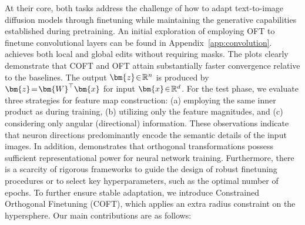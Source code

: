 At their core, both tasks address the challenge of how to adapt text-to-image diffusion models through finetuning while maintaining the generative capabilities established during pretraining. An initial exploration of employing OFT to finetune convolutional layers can be found in Appendix~\ref{app:convolution}. \cite{hertz2022prompt} achieves both local and global edits without requiring masks. The plots clearly demonstrate that COFT and OFT attain substantially faster convergence relative to the baselines. The output $\thickmuskip=2mu \medmuskip=2mu \bm{z}\in\mathbb{R}^n$ is produced by $\thickmuskip=2mu \medmuskip=2mu \bm{z}=\bm{W}^\top\bm{x}$ for input $\thickmuskip=2mu \medmuskip=2mu \bm{x}\in\mathbb{R}^d$. For the test phase, we evaluate three strategies for feature map construction: (a) employing the same inner product as during training, (b) utilizing only the feature magnitudes, and (c) considering only angular (directional) information. These observations indicate that neuron directions predominantly encode the semantic details of the input images. In addition, \cite{liu2021orthogonal} demonstrates that orthogonal transformations possess sufficient representational power for neural network training. Furthermore, there is a scarcity of rigorous frameworks to guide the design of robust finetuning procedures or to select key hyperparameters, such as the optimal number of epochs. To further ensure stable adaptation, we introduce Constrained Orthogonal Finetuning (COFT), which applies an extra radius constraint on the hypersphere. Our main contributions are as follows:

